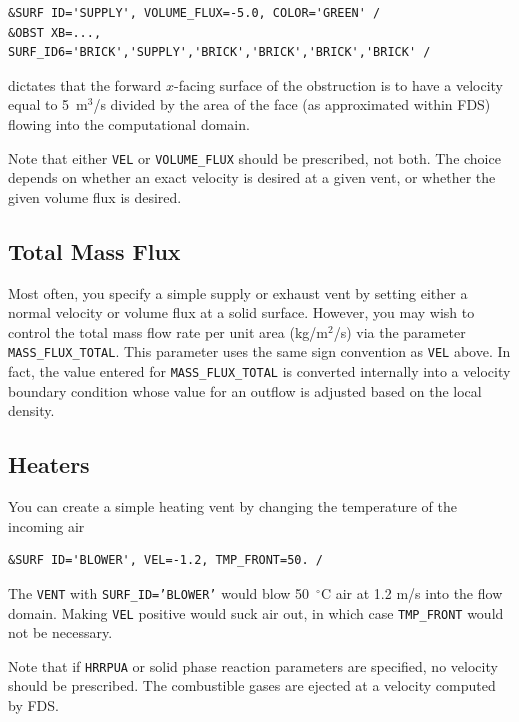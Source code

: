 \documentclass[11pt]{book}
\newcommand{\ct}{\tt\small}
\begin{document}
\footnotesize
\begin{verbatim}
&SURF ID='SUPPLY', VOLUME_FLUX=-5.0, COLOR='GREEN' /
&OBST XB=..., SURF_ID6='BRICK','SUPPLY','BRICK','BRICK','BRICK','BRICK' /
\end{verbatim}
\normalsize

\noindent
dictates that the forward $x$-facing surface of the obstruction is to have a velocity
equal to 5~m$^3$/s divided by the area of the face (as approximated within FDS) flowing into the
computational domain.

\begin{warning}
\noindent
Note that either {\ct VEL} or {\ct VOLUME\_FLUX} should be prescribed,
not both.  The choice depends on whether an exact velocity is desired at a
given vent, or whether the given volume flux is desired.
\end{warning}

\subsection{Total Mass Flux}

\label{info:MASS_FLUX_TOTAL}

Most often, you specify a simple supply or exhaust vent by setting either a normal velocity or volume flux at
a solid surface. However, you may wish to control the total mass flow rate per unit area (kg/m$^2$/s) via the parameter {\ct MASS\_FLUX\_TOTAL}. This parameter uses the same sign convention as {\ct VEL} above.  In fact, the value entered for
{\ct MASS\_FLUX\_TOTAL} is converted internally into a velocity boundary condition whose value
for an outflow is adjusted based on the local density.


\subsection{Heaters}

You can create a simple heating vent by changing the temperature of the incoming air

\footnotesize
\begin{verbatim}
&SURF ID='BLOWER', VEL=-1.2, TMP_FRONT=50. /
\end{verbatim}
\normalsize

\noindent
The {\ct VENT} with {\ct SURF\_ID='BLOWER'} would blow 50~$^\circ$C
air at 1.2 m/s into the flow domain. Making {\ct VEL} positive would
suck air out, in which case {\ct TMP\_FRONT} would not be necessary.

Note that if {\ct HRRPUA} or solid phase reaction parameters are
specified, no velocity should be prescribed. The combustible gases
are ejected at a velocity computed by FDS.
\end{document}
